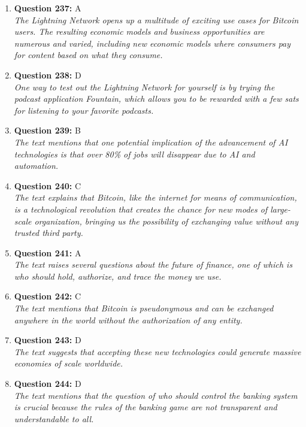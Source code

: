 \documentclass[12pt,a4paper]{article}
\begin{document}
\begin{enumerate}
\item \textbf{Question 237:} A
\\ \textit{The Lightning Network opens up a multitude of exciting use cases for Bitcoin users. The resulting economic models and business opportunities are numerous and varied, including new economic models where consumers pay for content based on what they consume.}

\item \textbf{Question 238:} D
\\ \textit{One way to test out the Lightning Network for yourself is by trying the podcast application Fountain, which allows you to be rewarded with a few sats for listening to your favorite podcasts.}

\item \textbf{Question 239:} B
\\ \textit{The text mentions that one potential implication of the advancement of AI technologies is that over 80\% of jobs will disappear due to AI and automation.}

\item \textbf{Question 240:} C
\\ \textit{The text explains that Bitcoin, like the internet for means of communication, is a technological revolution that creates the chance for new modes of large-scale organization, bringing us the possibility of exchanging value without any trusted third party.}

\item \textbf{Question 241:} A
\\ \textit{The text raises several questions about the future of finance, one of which is who should hold, authorize, and trace the money we use.}

\item \textbf{Question 242:} C
\\ \textit{The text mentions that Bitcoin is pseudonymous and can be exchanged anywhere in the world without the authorization of any entity.}

\item \textbf{Question 243:} D
\\ \textit{The text suggests that accepting these new technologies could generate massive economies of scale worldwide.}

\item \textbf{Question 244:} D
\\ \textit{The text mentions that the question of who should control the banking system is crucial because the rules of the banking game are not transparent and understandable to all.}


\end{enumerate}
\end{document}
